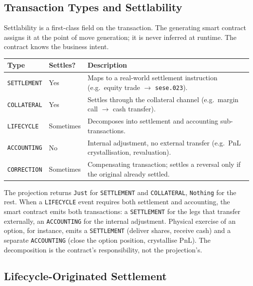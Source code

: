 \subsection{Transaction Types and Settlability}
\label{sec:settlement-types}

Settlability is a first-class field on the transaction. The generating smart contract assigns it at the point of move generation; it is never inferred at runtime. The contract knows the business intent.

\begin{center}
\begin{tabular}{l l p{7.5cm}}
\toprule
\textbf{Type} & \textbf{Settles?} & \textbf{Description} \\
\midrule
\texttt{SETTLEMENT} & Yes & Maps to a real-world settlement instruction (e.g.\ equity trade $\to$ \texttt{sese.023}). \\
\texttt{COLLATERAL} & Yes & Settles through the collateral channel (e.g.\ margin call $\to$ cash transfer). \\
\texttt{LIFECYCLE} & Sometimes & Decomposes into settlement and accounting sub-transactions. \\
\texttt{ACCOUNTING} & No & Internal adjustment, no external transfer (e.g.\ PnL crystallisation, revaluation). \\
\texttt{CORRECTION} & Sometimes & Compensating transaction; settles a reversal only if the original already settled. \\
\bottomrule
\end{tabular}
\end{center}

The projection returns \texttt{Just} for \texttt{SETTLEMENT} and \texttt{COLLATERAL}, \texttt{Nothing} for the rest. When a \texttt{LIFECYCLE} event requires both settlement and accounting, the smart contract emits both transactions: a \texttt{SETTLEMENT} for the legs that transfer externally, an \texttt{ACCOUNTING} for the internal adjustment. Physical exercise of an option, for instance, emits a \texttt{SETTLEMENT} (deliver shares, receive cash) and a separate \texttt{ACCOUNTING} (close the option position, crystallise PnL). The decomposition is the contract's responsibility, not the projection's.

\subsection{Lifecycle-Originated Settlement}
\label{sec:settlement-lifecycle}

